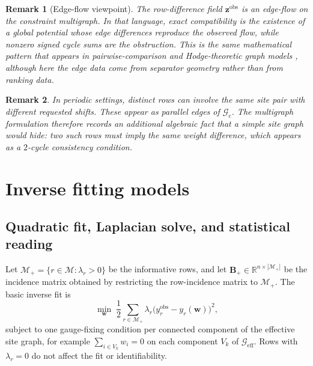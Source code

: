 \documentclass[preprint,12pt]{elsarticle}
\newtheorem{remark}{Remark}
\newcommand{\R}{\mathbb{R}}
\newcommand{\weights}{\mathbf{w}}
\newcommand{\rowset}{\mathcal{M}}
\newcommand{\cgraph}{\mathcal{G}_{\mathrm{c}}}
\newcommand{\effgraph}{\mathcal{G}_{\mathrm{eff}}}
\newcommand{\inc}{\mathbf{B}}
\begin{document}
\begin{remark}[Edge-flow viewpoint]
The row-difference field $\mathbf{z}^{\mathrm{obs}}$ is an edge-flow on the
constraint multigraph. In that language, exact compatibility is the existence
of a global potential whose edge differences reproduce the observed flow, while
nonzero signed cycle sums are the obstruction. This is the same mathematical
pattern that appears in pairwise-comparison and Hodge-theoretic graph models
\cite{Jiang2011}, although here the edge data come from separator geometry
rather than from ranking data.
\end{remark}

\begin{remark}
In periodic settings, distinct rows can involve the same site pair with
different requested shifts. These appear as parallel edges of $\cgraph$. The
multigraph formulation therefore records an additional algebraic fact that a
simple site graph would hide: two such rows must imply the same weight
difference, which appears as a $2$-cycle consistency condition.
\end{remark}

\section{Inverse fitting models}
\label{sec:inversefit}

\subsection{Quadratic fit, Laplacian solve, and statistical reading}
Let $\rowset_+=\{r\in\rowset:\lambda_r>0\}$ be the informative rows, and let
$\inc_+\in\R^{n\times |\rowset_+|}$ be the incidence matrix obtained by
restricting the row-incidence matrix to $\rowset_+$. The basic inverse fit is
\begin{equation}
    \min_{\weights} \; \frac12 \sum_{r\in\rowset_+} \lambda_r
    \bigl(y_r^{\mathrm{obs}} - y_r(\weights)\bigr)^2,
    \label{eq:wls}
\end{equation}
subject to one gauge-fixing condition per connected component of the effective
site graph, for example $\sum_{i\in V_k} w_i = 0$ on each component $V_k$ of
$\effgraph$. Rows with $\lambda_r=0$ do not affect the fit or identifiability.
\end{document}
